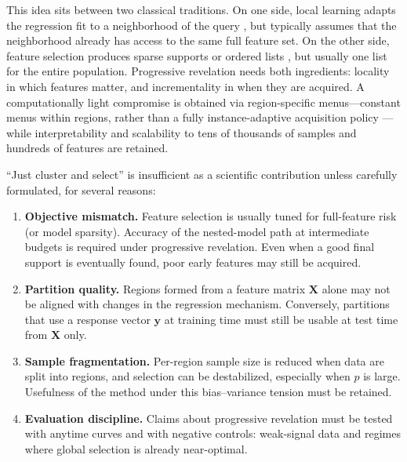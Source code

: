 \documentclass[pdflatex,sn-basic,Numbered]{sn-jnl}
\begin{document}
This idea sits between two classical traditions. On one side, local learning adapts the regression fit to a neighborhood of the query \cite{atkeson1997,cleveland1988}, but typically assumes that the neighborhood already has access to the same full feature set. On the other side, feature selection produces sparse supports or ordered lists \cite{guyon2003}, but usually one list for the entire population. Progressive revelation needs both ingredients: locality in which features matter, and incrementality in when they are acquired. A computationally light compromise is obtained via region-specific menus---constant menus within regions, rather than a fully instance-adaptive acquisition policy \cite{ma2019,covert2023}---while interpretability and scalability to tens of thousands of samples and hundreds of features are retained.

``Just cluster and select'' is insufficient as a scientific contribution unless carefully formulated, for several reasons:
\begin{enumerate}
  \item \textbf{Objective mismatch.} Feature selection is usually tuned for full-feature risk (or model sparsity). Accuracy of the nested-model path at intermediate budgets is required under progressive revelation. Even when a good final support is eventually found, poor early features may still be acquired.
  \item \textbf{Partition quality.} Regions formed from a feature matrix \(\mathbf{X}\) alone may not be aligned with changes in the regression mechanism. Conversely, partitions that use a response vector \(\mathbf{y}\) at training time must still be usable at test time from \(\mathbf{X}\) only.
  \item \textbf{Sample fragmentation.} Per-region sample size is reduced when data are split into regions, and selection can be destabilized, especially when \(p\) is large. Usefulness of the method under this bias--variance tension must be retained.
  \item \textbf{Evaluation discipline.} Claims about progressive revelation must be tested with anytime curves and with negative controls: weak-signal data and regimes where global selection is already near-optimal.
\end{enumerate}
\end{document}
